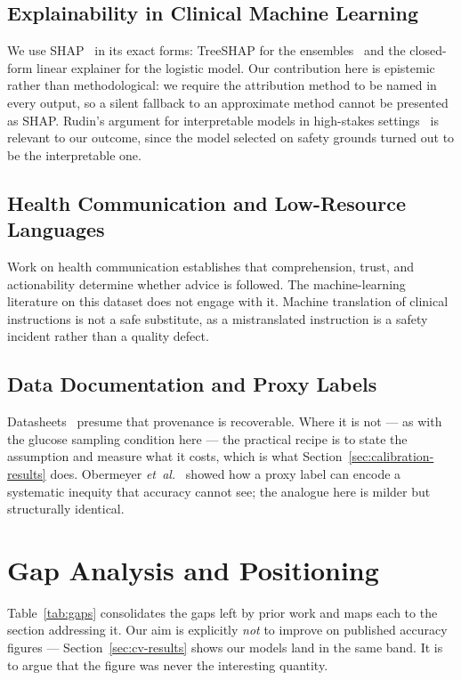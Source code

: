 \documentclass[journal]{IEEEtran}
\begin{document}
\subsection{Explainability in Clinical Machine Learning}
We use SHAP~\cite{lundberg2017shap} in its exact forms: TreeSHAP for the
ensembles~\cite{lundberg2020trees} and the closed-form linear explainer for the
logistic model. Our contribution here is epistemic rather than methodological:
we require the attribution method to be named in every output, so a silent
fallback to an approximate method cannot be presented as SHAP. Rudin's argument
for interpretable models in high-stakes settings~\cite{rudin2019stop} is
relevant to our outcome, since the model selected on safety grounds turned out
to be the interpretable one.

\subsection{Health Communication and Low-Resource Languages}
Work on health communication establishes that comprehension, trust, and
actionability determine whether advice is followed. The machine-learning
literature on this dataset does not engage with it. Machine translation of
clinical instructions is not a safe substitute, as a mistranslated instruction
is a safety incident rather than a quality defect.

\subsection{Data Documentation and Proxy Labels}
Datasheets~\cite{gebru2021datasheets} presume that provenance is recoverable.
Where it is not --- as with the glucose sampling condition here --- the
practical recipe is to state the assumption and measure what it costs, which is
what Section~\ref{sec:calibration-results} does. Obermeyer
\emph{et~al.}~\cite{obermeyer2019bias} showed how a proxy label can encode a
systematic inequity that accuracy cannot see; the analogue here is milder but
structurally identical.

\section{Gap Analysis and Positioning}

Table~\ref{tab:gaps} consolidates the gaps left by prior work and maps each to
the section addressing it. Our aim is explicitly \emph{not} to improve on
published accuracy figures --- Section~\ref{sec:cv-results} shows our models land
in the same band. It is to argue that the figure was never the interesting
quantity.
\end{document}
